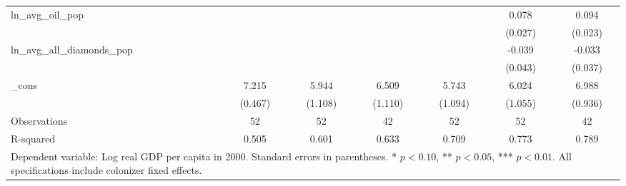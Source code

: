 \begin{table}[htbp]
\begin{tabular}{l*{6}{c}}
\addlinespace
ln\_avg\_oil\_pop&                     &                     &                     &                     &       0.078\sym{***}&       0.094\sym{***}\\
            &                     &                     &                     &                     &     (0.027)         &     (0.023)         \\
\addlinespace
ln\_avg\_all\_diamonds\_pop&                     &                     &                     &                     &      -0.039         &      -0.033         \\
            &                     &                     &                     &                     &     (0.043)         &     (0.037)         \\
\addlinespace
\_cons      &       7.215\sym{***}&       5.944\sym{***}&       6.509\sym{***}&       5.743\sym{***}&       6.024\sym{***}&       6.988\sym{***}\\
            &     (0.467)         &     (1.108)         &     (1.110)         &     (1.094)         &     (1.055)         &     (0.936)         \\
\midrule
Observations&          52         &          52         &          42         &          52         &          52         &          42         \\
R-squared   &       0.505         &       0.601         &       0.633         &       0.709         &       0.773         &       0.789         \\
\bottomrule
\multicolumn{7}{l}{\footnotesize Dependent variable: Log real GDP per capita in 2000. Standard errors in parentheses. * \(p<0.10\), ** \(p<0.05\), *** \(p<0.01\). All specifications include colonizer fixed effects.}\\
\end{tabular}
\end{table}
